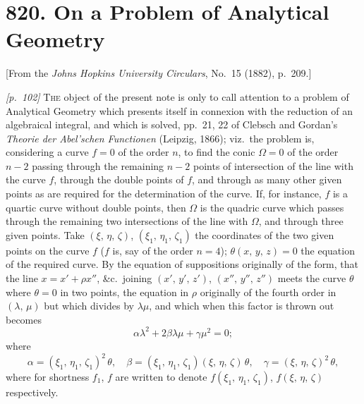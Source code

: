 \documentclass[11pt,a4paper]{article}
\theoremstyle{plain}
\theoremstyle{definition}
\theoremstyle{remark}
\begin{document}
\bigskip

\newpage
\section*{820. On a Problem of Analytical Geometry}

\begin{center}
\small[From the \textit{Johns Hopkins University Circulars}, No.~15 (1882), p.~209.]
\end{center}

\bigskip

\noindent\textit{[p.~102]} \textsc{The} object of the present note is only to call attention to a problem of Analytical Geometry which presents itself in connexion with the reduction of an algebraical integral, and which is solved, pp.~21, 22 of Clebsch and Gordan's \textit{Theorie der Abel'schen Functionen} (Leipzig, 1866); viz.\ the problem is, considering a curve $f=0$ of the order $n$, to find the conic $\Omega = 0$ of the order $n - 2$ passing through the remaining $n - 2$ points of intersection of the line with the curve $f$, through the double points of $f$, and through as many other given points as are required for the determination of the curve. If, for instance, $f$ is a quartic curve without double points, then $\Omega$ is the quadric curve which passes through the remaining two intersections of the line with $\Omega$, and through three given points. Take $(\xi,\,\eta,\,\zeta)$, $(\xi_1,\,\eta_1,\,\zeta_1)$ the coordinates of the two given points on the curve $f$ ($f$ is, say of the order $n = 4$); $\theta(x,\,y,\,z) = 0$ the equation of the required curve. By the equation of suppositions originally of the form, that the line $x = x' + \rho x''$, \&c.\ joining $(x',\,y',\,z')$, $(x'',\,y'',\,z'')$ meets the curve $\theta$ where $\theta = 0$ in two points, the equation in $\rho$ originally of the fourth order in $(\lambda,\,\mu)$ but which divides by $\lambda\mu$, and which when this factor is thrown out becomes
\[
\alpha\lambda^2 + 2\beta\lambda\mu + \gamma\mu^2 = 0;
\]
where
\[
\alpha = (\xi_1,\,\eta_1,\,\zeta_1)^2\,\theta,\quad
\beta = (\xi_1,\,\eta_1,\,\zeta_1)(\xi,\,\eta,\,\zeta)\,\theta,\quad
\gamma = (\xi,\,\eta,\,\zeta)^2\,\theta,
\]
where for shortness $f_1$, $f$ are written to denote $f(\xi_1,\,\eta_1,\,\zeta_1)$, $f(\xi,\,\eta,\,\zeta)$ respectively.
\end{document}
